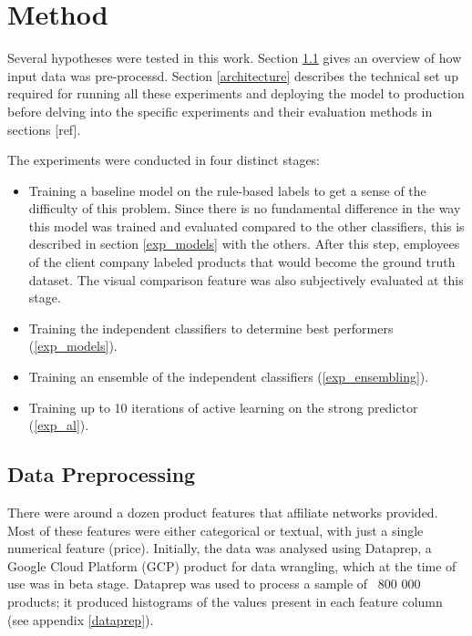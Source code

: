 \chapter{Method}


Several hypotheses were tested in this work.
Section \ref{data_pp} gives an overview of how input data was pre-processd.
Section \ref{architecture} describes the technical set up required for running all these experiments and deploying the model to production before delving into the specific experiments and their evaluation methods in sections [ref].

\hfill \break \noindent
The experiments were conducted in four distinct stages:

 \begin{itemize}
   \item Training a baseline model on the rule-based labels to get a sense of the difficulty of this problem. Since there is no fundamental difference in the way this model was  trained and evaluated compared to the other classifiers, this is described in section \ref{exp_models} with the others. After this step, employees of the client company labeled products that would become the ground truth dataset. The visual comparison feature was also subjectively evaluated at this stage.
   \item Training the independent classifiers to determine best performers (\ref{exp_models}).
   \item Training an ensemble of the independent classifiers (\ref{exp_ensembling}).
   \item Training up to 10 iterations of active learning on the strong predictor (\ref{exp_al}).
 \end{itemize}


 \section{Data Preprocessing}
 \label{data_pp}

There were around a dozen product features that affiliate networks provided.
Most of these features were either categorical or textual,  with just a single numerical feature (price).
Initially, the data was analysed using Dataprep, a Google Cloud Platform (GCP)  product for data wrangling, which at the time of use was in beta stage.
Dataprep  was used to process a sample of ~800 000 products;  it produced histograms of the values present in each feature column (see appendix \ref{dataprep}).

